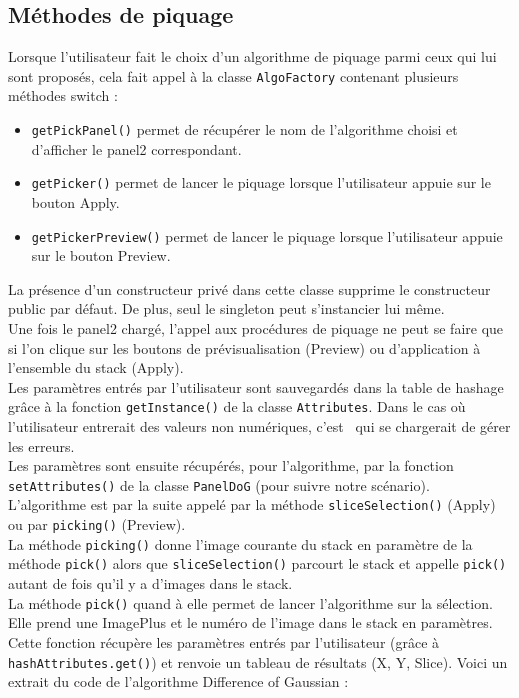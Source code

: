 \subsection{Méthodes de piquage}

Lorsque l'utilisateur fait le choix d'un algorithme de piquage parmi ceux qui lui sont proposés, cela fait appel à la classe \texttt{AlgoFactory} contenant plusieurs méthodes switch :
\begin{itemize}
\item \texttt{getPickPanel()} permet de récupérer le nom de l'algorithme choisi et d'afficher le panel2 correspondant.
\item \texttt{getPicker()} permet de lancer le piquage lorsque l'utilisateur appuie sur le bouton Apply.
\item \texttt{getPickerPreview()} permet de lancer le piquage lorsque l'utilisateur appuie sur le bouton Preview.
\end{itemize}

La présence d'un constructeur privé dans cette classe supprime le constructeur public par défaut. De plus, seul le singleton peut s'instancier lui même. \\

Une fois le panel2 chargé, l'appel aux procédures de piquage ne peut se faire que si l'on clique sur les boutons de prévisualisation (Preview) ou d'application à l'ensemble du stack (Apply). \\
Les paramètres entrés par l'utilisateur sont sauvegardés dans la table de hashage grâce à la fonction \texttt{getInstance()} de la classe \texttt{Attributes}. Dans le cas où l'utilisateur entrerait des valeurs non numériques, c'est \imj ~qui se chargerait de gérer les erreurs. \\
Les paramètres sont ensuite récupérés, pour l'algorithme, par la fonction \texttt{setAttributes()} de la classe \texttt{PanelDoG} (pour suivre notre scénario). \\
 L'algorithme est par la suite appelé par la méthode \texttt{sliceSelection()} (Apply) ou par \texttt{picking()} (Preview). \\

La méthode \texttt{picking()} donne l'image courante du stack en paramètre de la méthode \texttt{pick()} alors que \texttt{sliceSelection()} parcourt le stack et appelle \texttt{pick()} autant de fois qu'il y a d'images dans le stack. \\

La méthode \texttt{pick()} quand à elle permet de lancer l'algorithme sur la sélection. Elle prend une ImagePlus et le numéro de l'image dans le stack en paramètres. Cette fonction récupère les paramètres entrés par l'utilisateur (grâce à \texttt{hashAttributes.get()}) et renvoie un tableau de résultats (X, Y, Slice). Voici un extrait du code de l'algorithme Difference of Gaussian :

